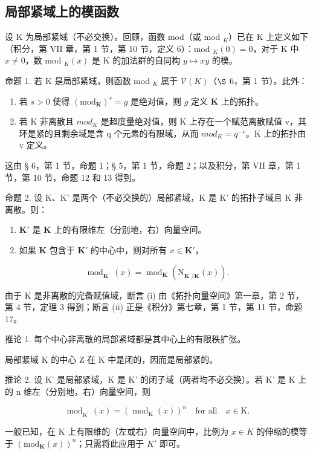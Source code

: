 \subsection{局部紧域上的模函数}

设 K 为局部紧域（不必交换）。回顾，函数 mod（或 mod \(_K\)）已在 K 上定义如下（积分，第 VII 章，第 1 节，第 10 节，定义 6）：mod \(_K(0) = 0\)，对于 K 中 \(x \neq 0\)，数 mod \(_K(x)\) 是 K 的加法群的自同构 \(y \mapsto xy\) 的模。

命题 1. 若 K 是局部紧域，则函数 mod \(_{K}\) 属于 \(\mathcal{V}(K)\)（\(\S\) 6，第 1 节）。此外：

\begin{enumerate}
\def\labelenumi{(\roman{enumi})}
\item
  若 \(s > 0\) 使得 \((\mathrm{mod}_{\mathbf{K}})^s = g\) 是绝对值，则 \(g\) 定义 \(\mathbf{K}\) 上的拓扑。
\item
  若 K 非离散且 \(mod_{K}\) 是超度量绝对值，则 K 上存在一个赋范离散赋值 v，其环是紧的且剩余域是含 q 个元素的有限域，从而 \(mod_{K} = q^{-v}\)。K 上的拓扑由 v 定义。
\end{enumerate}

这由 § 6，第 1 节，命题 1；§ 5，第 1 节，命题 2；以及积分，第 VII 章，第 1 节，第 10 节，命题 12 和 13 得到。

命题 2. 设 K、K' 是两个（不必交换的）局部紧域，K 是 K' 的拓扑子域且 K 非离散。则：

\begin{enumerate}
\def\labelenumi{(\roman{enumi})}
\item
  \(\mathbf{K}'\) 是 \(\mathbf{K}\) 上的有限维左（分别地，右）向量空间。
\item
  如果 \(\mathbf{K}\) 包含于 \(\mathbf{K}'\) 的中心中，则对所有 \(x \in \mathbf{K}'\)，
\end{enumerate}

\[
\operatorname{mod} _ {\mathbf {K} ^ {\prime}} (x) = \operatorname{mod} _ {\mathbf {K}} (\mathrm{N} _ {\mathbf {K} ^ {\prime} / \mathbf {K}} (x)).\tag{1}
\]

由于 K 是非离散的完备赋值域，断言 (i) 由《拓扑向量空间》第一章，第 2 节，第 4 节，定理 3 得到；断言 (ii) 正是《积分》第七章，第 1 节，第 11 节，命题 17。

推论 1. 每个中心非离散的局部紧域都是其中心上的有限秩扩张。

局部紧域 K 的中心 Z 在 K 中是闭的，因而是局部紧的。

推论 2. 设 K' 是局部紧域，K 是 K' 的闭子域（两者均不必交换）。若 K' 是 K 上的 n 维左（分别地，右）向量空间，则

\[
\operatorname{mod} _ {\mathrm{K} ^ {\prime}} (x) = (\operatorname{mod} _ {\mathrm{K}} (x)) ^ {n} \quad \text {for all} \quad x \in \mathrm{K}.\tag{2}
\]

一般已知，在 K 上有限维的（左或右）向量空间中，比例为 \(x \in K\) 的伸缩的模等于 \((\text{mod}_{\mathbf{K}}(x))^{n}\)；只需将此应用于 \(K'\) 即可。

